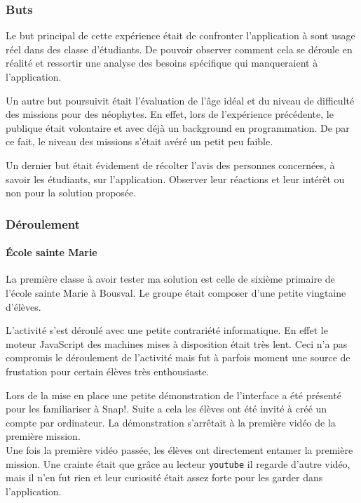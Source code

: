 \subsubsection{Buts}
Le but principal de cette expérience était de confronter l'application à sont usage réel dans des classe d'étudiants. De pouvoir observer comment cela se déroule en réalité et ressortir une analyse des besoins spécifique qui manqueraient à l'application.

Un autre but poursuivit était l'évaluation de l'âge idéal et du niveau de difficulté des missions pour des néophytes. En effet, lors de l'expérience précédente, le publique était volontaire et avec déjà un background en programmation. De par ce fait, le niveau des missions s'était avéré un petit peu faible.

Un dernier but était évidement de récolter l'avis des personnes concernées, à savoir les étudiants, sur l'application. Observer leur réactions et leur intérêt ou non pour la solution proposée.

\subsubsection{Déroulement}
\paragraph{École sainte Marie} La première classe à avoir tester ma solution est celle de sixième primaire de l'école sainte Marie à Bousval. Le groupe était composer d'une petite vingtaine d'élèves.

L'activité s'est déroulé avec une petite contrariété informatique. En effet le moteur JavaScript des machines mises à disposition était très lent. Ceci n'a pas compromis le déroulement de l'activité mais fut à parfois moment une source de frustation pour certain élèves très enthousiaste.

Lors de la mise en place une petite démonstration de l'interface a été présenté pour les familiariser à Snap!. Suite a cela les élèves ont été invité à créé un compte par ordinateur. La démonstration s'arrêtait à la première vidéo de la première mission.\\

Une fois la première vidéo passée, les élèves ont directement entamer la première mission. Une crainte était que grâce au lecteur \texttt{youtube} il regarde d'autre vidéo, mais il n'en fut rien et leur curiosité était assez forte pour les garder dans l'application.

